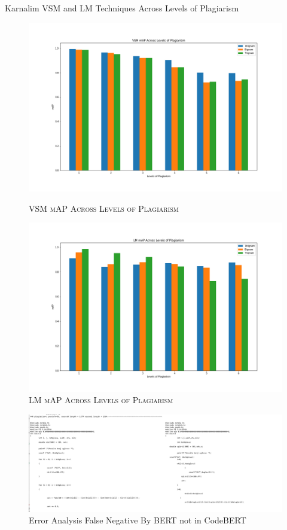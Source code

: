 \documentclass[twocolumn]{article}
\begin{document}
Karnalim VSM and LM Techniques Across Levels of Plagiarism
\begin{figure}[ht!]
\centering
\begin{minipage}[b]{.4\textwidth}
\includegraphics[width=1.0\textwidth]{images/VSM.png}
\caption{\textsc{VSM mAP Across Levels of Plagiarism}}\label{fig:vsm}
\end{minipage}\qquad
\begin{minipage}[b]{.4\textwidth}
\includegraphics[width=1.0\textwidth]{images/LM.png}
\caption{\textsc{LM mAP Across Levels of Plagiarism}}\label{fig:lm}
\end{minipage}
\end{figure}


\begin{figure}[t!]
\centering
\caption{Error Analysis False Negative By BERT not in CodeBERT}
\label{fig:BERTnotinCodeBERT}
\centering
\includegraphics[scale=0.3]{images/FNinBERTnotinCodeBERT.png}
\end{figure}
\end{document}
